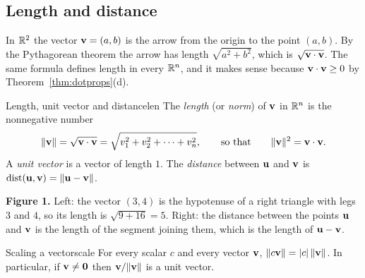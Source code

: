 \documentclass[11pt]{article}
\begin{document}
\subsection*{Length and distance}

In $\mathbb{R}^2$ the vector $\mathbf{v}=(a,b)$ is the arrow from the origin to the point $(a,b)$. By the Pythagorean theorem the arrow has length $\sqrt{a^2+b^2}$, which is $\sqrt{\mathbf{v}\cdot\mathbf{v}}$. The same formula defines length in every $\mathbb{R}^n$, and it makes sense because $\mathbf{v}\cdot\mathbf{v}\ge0$ by Theorem~\ref{thm:dotprops}(d).

\begin{defn}{Length, unit vector and distance}{len}
The \emph{length} (or \emph{norm}) of $\mathbf{v}$ in $\mathbb{R}^n$ is the nonnegative number
\[
\lVert\mathbf{v}\rVert=\sqrt{\mathbf{v}\cdot\mathbf{v}}=\sqrt{v_1^2+v_2^2+\cdots+v_n^2},\qquad\text{so that}\qquad\lVert\mathbf{v}\rVert^2=\mathbf{v}\cdot\mathbf{v}.
\]
A \emph{unit vector} is a vector of length $1$. The \emph{distance} between $\mathbf{u}$ and $\mathbf{v}$ is $\operatorname{dist}(\mathbf{u},\mathbf{v})=\lVert\mathbf{u}-\mathbf{v}\rVert$.
\end{defn}

\begin{center}
\end{center}

\noindent\textbf{Figure 1.} Left: the vector $(3,4)$ is the hypotenuse of a right triangle with legs $3$ and $4$, so its length is $\sqrt{9+16}=5$. Right: the distance between the points $\mathbf{u}$ and $\mathbf{v}$ is the length of the segment joining them, which is the length of $\mathbf{u}-\mathbf{v}$.

\begin{thm}{Scaling a vector}{scale}
For every scalar $c$ and every vector $\mathbf{v}$, $\lVert c\mathbf{v}\rVert=|c|\,\lVert\mathbf{v}\rVert$. In particular, if $\mathbf{v}\neq\mathbf{0}$ then $\mathbf{v}/\lVert\mathbf{v}\rVert$ is a unit vector.
\end{thm}
\end{document}
